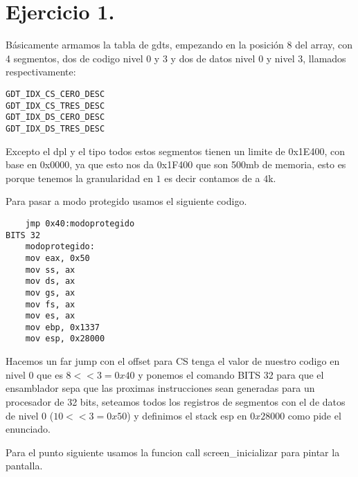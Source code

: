 \section*{Ejercicio 1.}
\noindent Básicamente armamos la tabla de gdts, empezando en la posición $8$ del array, con 4 segmentos, dos de codigo nivel $0$ y $3$ y dos de datos nivel $0$ y nivel $3$, llamados respectivamente:

\begin{codesnippet}
\begin{verbatim}
GDT_IDX_CS_CERO_DESC
GDT_IDX_CS_TRES_DESC
GDT_IDX_DS_CERO_DESC
GDT_IDX_DS_TRES_DESC
\end{verbatim}
\end{codesnippet}

\noindent Excepto el dpl y el tipo todos estos segmentos tienen un limite de 0x1E400, con base en 0x0000, ya que esto nos da 0x1F400 que son 500mb de memoria, esto es porque tenemos la granularidad en $1$ es decir contamos de a $4$k.

\noindent Para pasar a modo protegido usamos el siguiente codigo.
\begin{codesnippet}
\begin{verbatim}
    jmp 0x40:modoprotegido
BITS 32
    modoprotegido:
    mov eax, 0x50
    mov ss, ax
    mov ds, ax
    mov gs, ax
    mov fs, ax
    mov es, ax
    mov ebp, 0x1337
    mov esp, 0x28000
\end{verbatim}
\end{codesnippet}

\noindent Hacemos un far jump con el offset para CS tenga el valor de nuestro codigo en nivel $0$ que es $8 << 3 = 0x40$ y ponemos el comando BITS 32 para que el ensamblador sepa que las proximas instrucciones sean generadas para un procesador de 32 bits, seteamos todos los registros de segmentos con el de datos de nivel $0$ ($10 << 3 = 0x50$) y definimos el stack esp en $0x28000$ como pide el enunciado. 

\noindent Para el punto siguiente usamos la funcion call screen\_inicializar para pintar la pantalla.